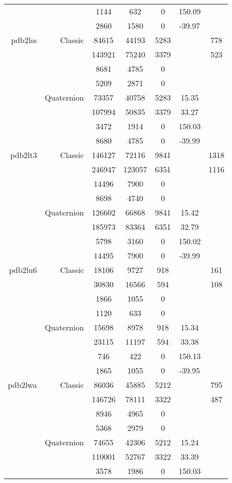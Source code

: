 \begin{xltabular}{\textwidth}{r|rcccSc}
& & 1144 & 632 & 0 & 150.09 & \\
& & 2860 & 1580 & 0 & -39.97 & \\ \addlinespace
pdb2lss & Classic & 84615 & 44193 & 5283 & & 778 \\
& & 143921 & 75240 & 3379 & & 523 \\
& & 8681 & 4785 & 0 & & \\
& & 5209 & 2871 & 0 & & \\
& Quaternion & 73357 & 40758 & 5283 & 15.35 & \\
& & 107994 & 50835 & 3379 & 33.27 & \\
& & 3472 & 1914 & 0 & 150.03 & \\
& & 8680 & 4785 & 0 & -39.99 & \\ \addlinespace
pdb2lt3 & Classic & 146127 & 72116 & 9841 & & 1318 \\
& & 246947 & 123057 & 6351 & & 1116 \\
& & 14496 & 7900 & 0 & & \\
& & 8698 & 4740 & 0 & & \\
& Quaternion & 126602 & 66868 & 9841 & 15.42 & \\
& & 185973 & 83364 & 6351 & 32.79 & \\
& & 5798 & 3160 & 0 & 150.02 & \\
& & 14495 & 7900 & 0 & -39.99 & \\ \addlinespace
pdb2lu6 & Classic & 18106 & 9727 & 918 & & 161 \\
& & 30830 & 16566 & 594 & & 108 \\
& & 1866 & 1055 & 0 & & \\
& & 1120 & 633 & 0 & & \\
& Quaternion & 15698 & 8978 & 918 & 15.34 & \\
& & 23115 & 11197 & 594 & 33.38 & \\
& & 746 & 422 & 0 & 150.13 & \\
& & 1865 & 1055 & 0 & -39.95 & \\ \addlinespace
pdb2lwa & Classic & 86036 & 45885 & 5212 & & 795 \\
& & 146726 & 78111 & 3322 & & 487 \\
& & 8946 & 4965 & 0 & & \\
& & 5368 & 2979 & 0 & & \\
& Quaternion & 74655 & 42306 & 5212 & 15.24 & \\
& & 110001 & 52767 & 3322 & 33.39 & \\
& & 3578 & 1986 & 0 & 150.03 & \\

\end{xltabular}
